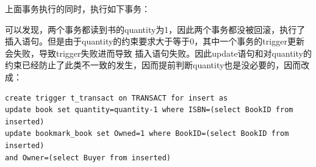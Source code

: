 \documentclass[UTF8, a4paper, 11pt]{article}
\begin{document}
上面事务执行的同时，执行如下事务：
\begin{figure}[H]
\end{figure}
可以发现，两个事务都读到书的quantity为1，因此两个事务都没被回滚，执行了插入语句。但是由于quantity的约束要求大于等于0，其中一个事务的trigger更新会失败，导致trigger失败进而导致
插入语句失败。因此update语句和对quantity的约束已经防止了此类不一致的发生，因而提前判断quantity也是没必要的，因而改成：
\begin{lstlisting}
create trigger t_transact on TRANSACT for insert as
update book set quantity=quantity-1 where ISBN=(select BookID from inserted)
update bookmark_book set Owned=1 where BookID=(select BookID from inserted)
and Owner=(select Buyer from inserted)
\end{lstlisting}
%
%
\end{document}
